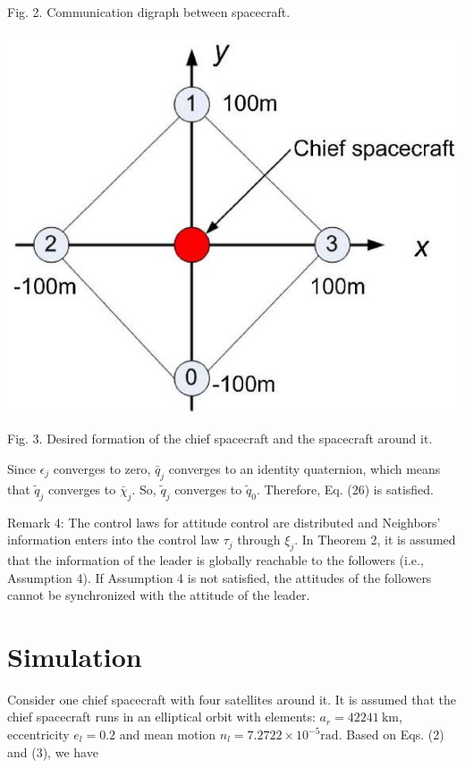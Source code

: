 \documentclass[10pt]{article}
\begin{document}
Fig. 2. Communication digraph between spacecraft.

\begin{center}
\includegraphics[max width=\textwidth]{2023_10_07_a50fd94fd281fe9896c1g-07(2)}
\end{center}

Fig. 3. Desired formation of the chief spacecraft and the spacecraft around it.

Since $\epsilon_{j}$ converges to zero, $\bar{q}_{j}$ converges to an identity quaternion, which means that $\tilde{q}_{j}$ converges to $\bar{\chi}_{j}$. So, $\tilde{q}_{j}$ converges to $\tilde{q}_{0}$. Therefore, Eq. (26) is satisfied.

Remark 4: The control laws for attitude control are distributed and Neighbors' information enters into the control law $\tau_{j}$ through $\xi_{j}$. In Theorem 2, it is assumed that the information of the leader is globally reachable to the followers (i.e., Assumption 4). If Assumption 4 is not satisfied, the attitudes of the followers cannot be synchronized with the attitude of the leader.

\section{Simulation}
Consider one chief spacecraft with four satellites around it. It is assumed that the chief spacecraft runs in an elliptical orbit with elements: $a_{r}=42241 \mathrm{~km}$, eccentricity $e_{l}=0.2$ and mean motion $n_{l}=7.2722 \times 10^{-5} \mathrm{rad}$. Based on Eqs. (2) and (3), we have
\end{document}
